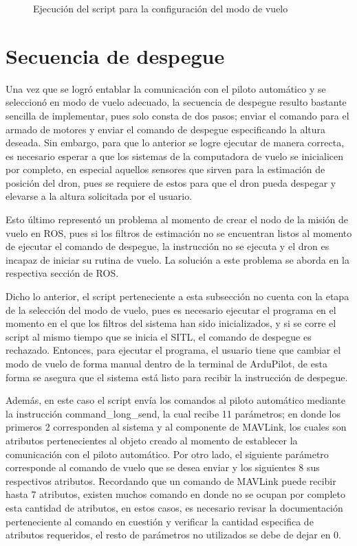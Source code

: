 \begin{figure}[ht]
    \centering
    \hfill
    \caption{Ejecución del script para la configuración del modo de vuelo}
    \label{fig:pymav_modes}
\end{figure}


\section{Secuencia de despegue}

Una vez que se logró entablar la comunicación con el piloto automático y se seleccionó en modo de vuelo adecuado, la secuencia de despegue resulto bastante sencilla de implementar, pues solo consta de dos pasos; enviar el comando para el armado de motores y enviar el comando de despegue especificando la altura deseada. Sin embargo, para que lo anterior se logre ejecutar de manera correcta, es necesario esperar a que los sistemas de la computadora de vuelo se inicialicen por completo, en especial aquellos sensores que sirven para la estimación de posición del dron, pues se requiere de estos para que el dron pueda despegar y elevarse a la altura solicitada por el usuario.

Esto último representó un problema al momento de crear el nodo de la misión de vuelo en ROS, pues si los filtros de estimación no se encuentran listos al momento de ejecutar el comando de despegue, la instrucción no se ejecuta y el dron es incapaz de iniciar su rutina de vuelo. La solución a este problema se aborda en la respectiva sección de ROS.

Dicho lo anterior, el script perteneciente a esta subsección no cuenta con la etapa de la selección del modo de vuelo, pues es necesario ejecutar el programa en el momento en el que los filtros del sistema han sido inicializados, y si se corre el script al mismo tiempo que  se inicia el SITL, el comando de despegue es rechazado. Entonces, para ejecutar el programa, el usuario tiene que cambiar el modo de vuelo de forma manual dentro de la terminal de ArduPilot, de esta forma se asegura que el sistema está listo para recibir la instrucción de despegue.

Además, en este caso el script envía los comandos al piloto automático mediante la instrucción command\_long\_send, la cual recibe 11 parámetros; en donde los primeros 2 corresponden al sistema y al componente de MAVLink, los cuales son atributos pertenecientes al objeto creado al momento de establecer la comunicación con el piloto automático. Por otro lado, el siguiente parámetro corresponde al comando de vuelo que se desea enviar y los siguientes 8 sus respectivos atributos. Recordando que un comando de MAVLink puede recibir hasta 7 atributos, existen muchos comando en donde no se ocupan por completo esta cantidad de atributos, en estos casos, es necesario revisar la documentación perteneciente al comando en cuestión y verificar la cantidad especifica de atributos requeridos, el resto de parámetros no utilizados se debe de dejar en 0.

